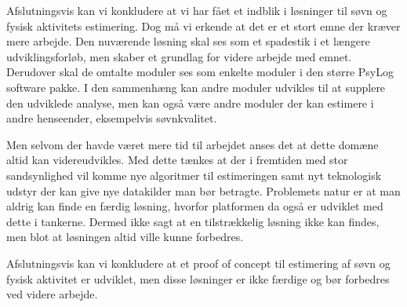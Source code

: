 Afslutningsvis kan vi konkludere at vi har fået et indblik i løsninger til søvn og fysisk aktivitets estimering.
Dog må vi erkende at det er et stort emne der kræver mere arbejde.
Den nuværende løsning skal ses som et spadestik i et længere udviklingsforløb, men skaber et grundlag for videre arbejde med emnet.
Derudover skal de omtalte moduler ses som enkelte moduler i den større PsyLog software pakke.
I den sammenhæng kan andre moduler udvikles til at supplere den udviklede analyse, men kan også være andre moduler der kan estimere i andre henseender, eksempelvis søvnkvalitet.


Men selvom der havde været mere tid til arbejdet anses det at dette domæne altid kan videreudvikles.
Med dette tænkes at der i fremtiden med stor sandsynlighed vil komme nye algoritmer til estimeringen samt nyt teknologisk udstyr der kan give nye datakilder man bør betragte.
Problemets natur er at man aldrig kan finde en færdig løsning, hvorfor platformen da også er udviklet med dette i tankerne.
Dermed ikke sagt at en tilstrækkelig løsning ikke kan findes, men blot at løsningen altid ville kunne forbedres.

Afslutningsvis kan vi konkludere at et proof of concept til estimering af søvn og fysisk aktivitet er udviklet, men disse løsninger er ikke færdige og bør forbedres ved videre arbejde.


